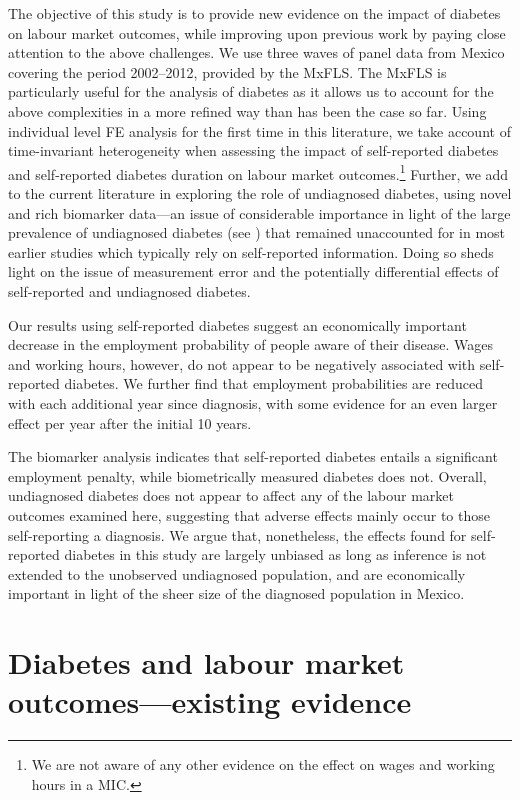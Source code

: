 The objective of this study is to provide new evidence on the impact of diabetes on labour market outcomes, while improving upon previous work by paying close attention to the above challenges. We use three waves of panel data from Mexico covering the period 2002--2012, provided by the \acf{MxFLS}. The \ac{MxFLS} is particularly useful for the analysis of diabetes as it allows us to account for the above complexities in a more refined way than has been the case so far. Using individual level \ac{FE} analysis for the first time in this literature, we take account of time-invariant heterogeneity when assessing the impact of self-reported diabetes and self-reported diabetes duration on labour market outcomes.\footnote{We are not aware of any other evidence on the effect on wages and working hours in a \ac{MIC}.} Further, we add to the current literature in exploring the role of undiagnosed diabetes, using novel and rich biomarker data---an issue of considerable importance in light of the large prevalence of undiagnosed diabetes (see \textcite{Beagley2014}) that remained unaccounted for in most earlier studies which typically rely on self-reported information. Doing so sheds light on the issue of measurement error and the potentially differential effects of self-reported and undiagnosed diabetes. 

Our results using self-reported diabetes suggest an economically important decrease in the employment probability of people aware of their disease. Wages and working hours, however, do not appear to be negatively associated with self-reported diabetes. We further find that employment probabilities are reduced with each additional year since diagnosis, with some evidence for an even larger effect per year after the initial 10 years. 

The biomarker analysis indicates that self-reported diabetes entails a significant employment penalty, while biometrically measured diabetes does not. Overall, undiagnosed diabetes does not appear to affect any of the labour market outcomes examined here, suggesting that adverse effects mainly occur to those self-reporting a diagnosis. We argue that, nonetheless, the effects found for self-reported diabetes in this study are largely unbiased as long as inference is not extended to the unobserved undiagnosed population, and are economically important in light of the sheer size of the diagnosed population in Mexico.


\section{\label{sec:labour  outcomes and diabetes literature}Diabetes and labour market outcomes---existing evidence}

